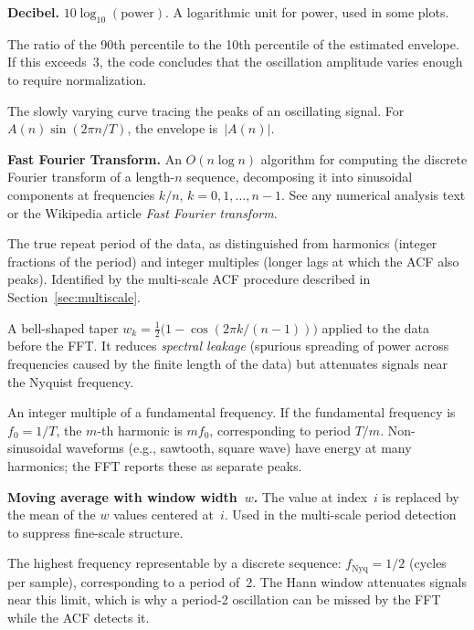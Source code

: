 \documentclass[11pt]{article}
\begin{document}
\begin{description}[style=nextline, leftmargin=3cm]
\item[dB] \textbf{Decibel.}  $10\log_{10}(\text{power})$.  A logarithmic
  unit for power, used in some plots.

\item[Dynamic range] The ratio of the 90th percentile to the 10th
  percentile of the estimated envelope.  If this exceeds~3, the code
  concludes that the oscillation amplitude varies enough to require
  normalization.

\item[Envelope] The slowly varying curve tracing the peaks of an
  oscillating signal.  For $A(n)\sin(2\pi n/T)$, the envelope
  is~$|A(n)|$.

\item[FFT] \textbf{Fast Fourier Transform.}  An $O(n\log n)$ algorithm
  for computing the discrete Fourier transform of a length-$n$ sequence,
  decomposing it into sinusoidal components at frequencies $k/n$,
  $k = 0, 1, \ldots, n-1$.  See any numerical analysis text or the
  Wikipedia article \emph{Fast Fourier transform}.

\item[Fundamental period] The true repeat period of the data, as
  distinguished from harmonics (integer fractions of the period) and
  integer multiples (longer lags at which the ACF also peaks).  Identified
  by the multi-scale ACF procedure described in
  Section~\ref{sec:multiscale}.

\item[Hann window] A bell-shaped taper $w_k = \frac{1}{2}
  \bigl(1 - \cos(2\pi k / (n-1))\bigr)$ applied to the data before the
  FFT\@.  It reduces \emph{spectral leakage} (spurious spreading of power
  across frequencies caused by the finite length of the data) but
  attenuates signals near the Nyquist frequency.

\item[Harmonic] An integer multiple of a fundamental frequency.  If the
  fundamental frequency is $f_0 = 1/T$, the $m$-th harmonic is $mf_0$,
  corresponding to period $T/m$.  Non-sinusoidal waveforms (e.g.,
  sawtooth, square wave) have energy at many harmonics; the FFT reports
  these as separate peaks.

\item[MA($w$)] \textbf{Moving average with window width~$w$.}  The value
  at index~$i$ is replaced by the mean of the $w$ values centered at~$i$.
  Used in the multi-scale period detection to suppress fine-scale structure.

\item[Nyquist frequency] The highest frequency representable by a
  discrete sequence: $f_{\mathrm{Nyq}} = 1/2$ (cycles per sample),
  corresponding to a period of~2.  The Hann window attenuates signals
  near this limit, which is why a period-2 oscillation can be missed by
  the FFT while the ACF detects it.


\end{description}
\end{document}
